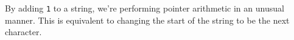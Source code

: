 %
By adding \texttt{1} to a string, we're performing pointer
arithmetic in an unusual manner.  This is equivalent to changing the
start of the string to be the next character.
